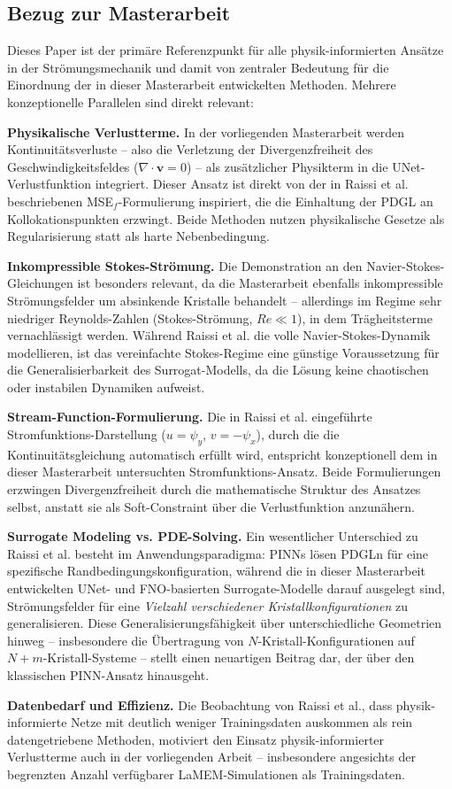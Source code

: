 \documentclass[a4paper,12pt]{article}
\begin{document}
\subsection*{Bezug zur Masterarbeit}

Dieses Paper ist der primäre Referenzpunkt für alle physik-informierten Ansätze in der Strömungsmechanik und damit von zentraler Bedeutung für die Einordnung der in dieser Masterarbeit entwickelten Methoden. Mehrere konzeptionelle Parallelen sind direkt relevant:

\textbf{Physikalische Verlustterme.} In der vorliegenden Masterarbeit werden Kontinuitätsverluste -- also die Verletzung der Divergenzfreiheit des Geschwindigkeitsfeldes ($\nabla \cdot \mathbf{v} = 0$) -- als zusätzlicher Physikterm in die UNet-Verlustfunktion integriert. Dieser Ansatz ist direkt von der in Raissi et al. beschriebenen MSE$_f$-Formulierung inspiriert, die die Einhaltung der PDGL an Kollokationspunkten erzwingt. Beide Methoden nutzen physikalische Gesetze als Regularisierung statt als harte Nebenbedingung.

\textbf{Inkompressible Stokes-Strömung.} Die Demonstration an den Navier-Stokes-Gleichungen ist besonders relevant, da die Masterarbeit ebenfalls inkompressible Strömungsfelder um absinkende Kristalle behandelt -- allerdings im Regime sehr niedriger Reynolds-Zahlen (Stokes-Strömung, $Re \ll 1$), in dem Trägheitsterme vernachlässigt werden. Während Raissi et al. die volle Navier-Stokes-Dynamik modellieren, ist das vereinfachte Stokes-Regime eine günstige Voraussetzung für die Generalisierbarkeit des Surrogat-Modells, da die Lösung keine chaotischen oder instabilen Dynamiken aufweist.

\textbf{Stream-Function-Formulierung.} Die in Raissi et al. eingeführte Stromfunktions-Darstellung ($u = \psi_y$, $v = -\psi_x$), durch die die Kontinuitätsgleichung automatisch erfüllt wird, entspricht konzeptionell dem in dieser Masterarbeit untersuchten Stromfunktions-Ansatz. Beide Formulierungen erzwingen Divergenzfreiheit durch die mathematische Struktur des Ansatzes selbst, anstatt sie als Soft-Constraint über die Verlustfunktion anzunähern.

\textbf{Surrogate Modeling vs. PDE-Solving.} Ein wesentlicher Unterschied zu Raissi et al. besteht im Anwendungsparadigma: PINNs lösen PDGLn für eine spezifische Randbedingungskonfiguration, während die in dieser Masterarbeit entwickelten UNet- und FNO-basierten Surrogate-Modelle darauf ausgelegt sind, Strömungsfelder für eine \textit{Vielzahl verschiedener Kristallkonfigurationen} zu generalisieren. Diese Generalisierungsfähigkeit über unterschiedliche Geometrien hinweg -- insbesondere die Übertragung von $N$-Kristall-Konfigurationen auf $N+m$-Kristall-Systeme -- stellt einen neuartigen Beitrag dar, der über den klassischen PINN-Ansatz hinausgeht.

\textbf{Datenbedarf und Effizienz.} Die Beobachtung von Raissi et al., dass physik-informierte Netze mit deutlich weniger Trainingsdaten auskommen als rein datengetriebene Methoden, motiviert den Einsatz physik-informierter Verlustterme auch in der vorliegenden Arbeit -- insbesondere angesichts der begrenzten Anzahl verfügbarer LaMEM-Simulationen als Trainingsdaten.
\end{document}
